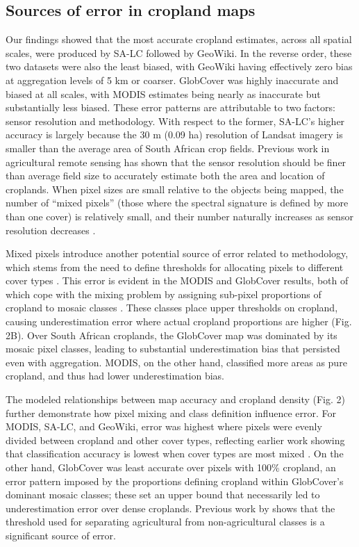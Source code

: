\documentclass[a4paper]{article}
\begin{document}
\vspace{-0.3 cm} 
\subsection*{Sources of error in cropland maps}
\vspace{-0.2 cm}
Our findings showed that the most accurate cropland estimates, across all spatial scales, were produced by SA-LC followed by GeoWiki. In the reverse order, these two datasets were also the least biased, with GeoWiki having effectively zero bias at aggregation levels of 5 km or coarser.  GlobCover was highly inaccurate and biased at all scales, with MODIS estimates being nearly as inaccurate but substantially less biased. These error patterns are attributable to two factors: sensor resolution and methodology. With respect to the former, SA-LC's higher accuracy is largely because the 30 m (0.09 ha) resolution of Landsat imagery is smaller than the average area of South African crop fields. Previous work in agricultural remote sensing has shown that the sensor resolution should be finer than average field size to accurately estimate both the area and location of croplands\citep{ozdogan_resolution_2006,pax-lenney_effect_1997}. When pixel sizes are small relative to the objects being mapped, the number of ``mixed pixels'' (those where the spectral signature is defined by more than one cover) is relatively small, and their number naturally increases as sensor resolution decreases \citep{ozdogan_resolution_2006}. 

Mixed pixels introduce another potential source of error related to methodology, which stems from the need to define thresholds for allocating pixels to different cover types \citep{ozdogan_resolution_2006}. This error is evident in the MODIS and GlobCover results, both of which cope with the mixing problem by assigning sub-pixel proportions of cropland to mosaic classes \citep{friedl_modis_2010,arino_global_2012}. These classes place upper thresholds on cropland, causing underestimation error where actual cropland proportions are higher  (Fig. 2B). Over South African croplands, the GlobCover map was dominated by its mosaic pixel classes, leading to substantial underestimation bias that persisted even with aggregation. MODIS, on the other hand, classified more areas as pure cropland, and thus had lower underestimation bias.  

The modeled relationships between map accuracy and cropland density (Fig. 2) further demonstrate how pixel mixing and class definition influence error. For MODIS, SA-LC, and GeoWiki, error was highest where pixels were evenly divided between cropland and other cover types, reflecting earlier work showing that classification accuracy is lowest when cover types are most mixed \citep{verburg_challenges_2011,gross_monitoring_2013}. On the other hand, GlobCover was least accurate over pixels with 100\% cropland, an error pattern imposed by the proportions defining cropland within GlobCover's dominant mosaic classes; these set an upper bound that necessarily led to underestimation error over dense croplands. Previous work by \citet{ozdogan_resolution_2006} shows that the threshold used for separating agricultural from non-agricultural classes is a significant source of error.   
\end{document}
